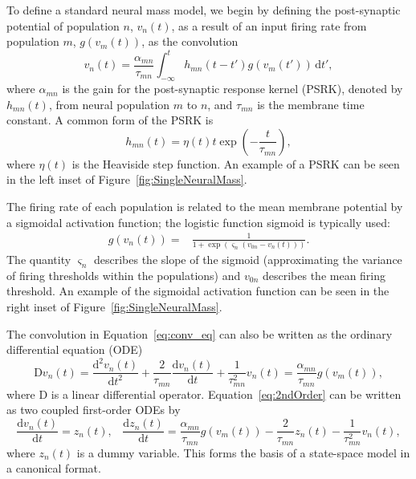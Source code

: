 \documentclass{article}
\begin{document}
To define a standard neural mass model, we begin by defining the post-synaptic potential of population $n$, $v_n(t)$, as a result of an input firing rate from population $m$, $g(v_m(t))$, as the convolution
\begin{equation}\label{eq:conv_eq}
    v_n(t) = \frac{\alpha_{mn}}{\tau_{mn}}\int_{-\infty}^t  h_{mn}(t-t')g(v_m(t')) \,\mathrm{d}t',
\end{equation}
where $\alpha_{mn}$ is the gain for the post-synaptic response kernel (PSRK), denoted by $h_{mn}(t)$, from neural population $m$ to $n$, and $\tau_{mn}$ is the membrane time constant. A common form of the PSRK is
\begin{equation}
    h_{mn}(t) = \eta(t)t\exp\left(-\frac{t}{\tau_{mn}}\right),
\end{equation}
where $\eta(t)$ is the Heaviside step function. An example of a PSRK can be seen in the left inset of Figure~\ref{fig:SingleNeuralMass}.  

The firing rate of each population is related to the mean membrane potential by a sigmoidal activation function; the logistic function sigmoid is typically used: 
\begin{align}
    g\left(v_n(t)\right) =& \frac{1}{1+\exp{\left(\varsigma_n\left(v_{0n} - v_n(t)\right)\right)}}.
    \label{eq:sigmoid}
\end{align}
The quantity $\varsigma_n$ describes the slope of the sigmoid (approximating the variance of firing thresholds within the populations) and $v_{0n}$ describes the mean firing threshold. An example of the sigmoidal activation function can be seen in the right inset of Figure~\ref{fig:SingleNeuralMass}.

The convolution in Equation~\ref{eq:conv_eq} can also be written as the ordinary differential equation (ODE)
\begin{equation}\label{eq:2ndOrder}
    \mathrm{D}v_n(t) = \frac{\mathrm{d}^2 v_n(t)}{\mathrm{d}t^2} + \frac{2}{\tau_{mn}}\frac{\mathrm{d} v_n(t)}{\mathrm{d}t} + \frac{1}{\tau_{mn}^2} v_n(t) = \frac{\alpha_{mn}}{\tau_{mn}} g(v_m(t)),
\end{equation}
where $\mathrm{D}$ is a linear differential operator. Equation~\ref{eq:2ndOrder} can be written as two coupled first-order ODEs by 
\begin{equation} \label{eq:2ndOrderNMM}
    \frac{\mathrm{d} v_n(t)}{\mathrm{d}t} = z_n(t),\,\,\,\,\,    \frac{\mathrm{d}z_n(t)}{\mathrm{d}t} = \frac{\alpha_{mn}}{\tau_{mn}} g(v_m(t)) - \frac{2}{\tau_{mn}}z_n(t) - \frac{1}{\tau_{mn}^2} v_n(t),
\end{equation}
where $z_n(t)$ is a dummy variable. This forms the basis of a state-space model in a canonical format.
\end{document}
